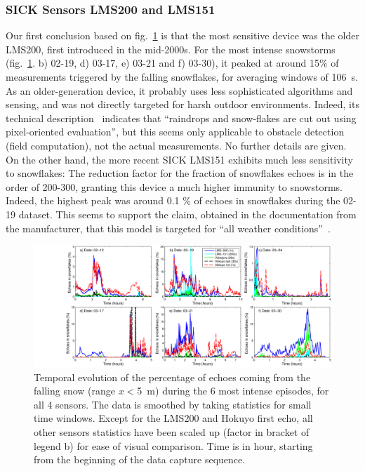 \subsubsection{SICK Sensors LMS200 and LMS151}
Our first conclusion based on fig.~\ref{fig:TimingSnow} is that the most sensitive device was the older LMS200, first introduced in the mid-2000s. For the most intense snowstorms (fig.~\ref{fig:TimingSnow}. b) 02-19, d) 03-17, e) 03-21 and f) 03-30), it peaked at around 15\% of measurements triggered by the falling snowflakes, for averaging windows of \SI{106}{\second}. As an older-generation device, it probably uses less sophisticated algorithms and sensing, and was not directly targeted for harsh outdoor environments. Indeed, its technical description~\cite{LMS200Manual} indicates that ``raindrops and snow-flakes are cut out using pixel-oriented evaluation'', but this seems only applicable to obstacle detection (field computation), not the actual measurements. No further details are given. On the other hand, the more recent SICK LMS151 exhibits much less sensitivity to snowflakes: The reduction factor for the fraction of snowflakes echoes is in the order of 200-300, granting this device a much higher immunity to snowstorms. Indeed, the highest peak was around 0.1 \% of echoes in snowflakes during the 02-19 dataset. This seems to support the claim, obtained in the documentation from the manufacturer, that this model is targeted for ``all weather conditions''~\cite{LMS151Manual}.


\begin{figure}[th]
    \centering
    \includegraphics[trim={3.2cm 0 0 0},clip,width=0.97\linewidth]{./img/Timings.png}
    \caption{Temporal evolution of the percentage of echoes coming from the falling snow (range $x<$\SI{5}{\meter}) during the 6 most intense episodes, for all 4 sensors. The data is smoothed by taking statistics for small time windows. Except for the LMS200 and Hokuyo first echo, all other sensors statistics have been scaled up (factor in bracket of legend b) for ease of visual comparison. Time is in hour, starting from the beginning of the data capture sequence.}
    \label{fig:TimingSnow}
\end{figure}


